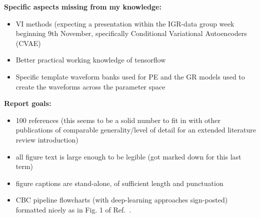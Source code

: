 \documentclass[11pt]{article}
\begin{document}
\noindent
\textbf{Specific aspects missing from my knowledge:}
\begin{itemize}
  \item \ac{VI} methods (expecting a presentation within the IGR-data group week beginning 9th November, specifically Conditional Variational Autoencoders (CVAE)
  \item Better practical working knowledge of tensorflow~\cite{tensorflow}
  \item Specific template waveform banks used for \ac{PE} and the GR models used to create the waveforms across the parameter space
\end{itemize}

\noindent
\textbf{Report goals:}
\begin{itemize}
    \item 100 references (this seems to be a solid number to fit in with other publications of comparable generality/level of detail for an extended literature review introduction) 
    \item all figure text is large enough to be legible (got marked down for this last term)
    \item figure captions are stand-alone, of sufficient length and punctuation
    \item \ac{CBC} pipeline flowcharts (with deep-learning approaches sign-posted) formatted nicely as in Fig. 1 of Ref.~\cite{gstlal_gen1_2017}.
\end{itemize}









\end{document}
